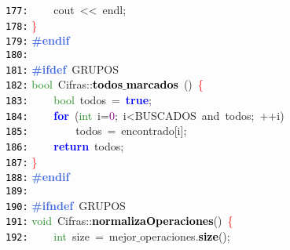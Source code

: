 \documentclass[a4paper,10pt]{scrartcl}
\begin{document}
{   \mbox{}\texttt{\textcolor{Black}{177:}} \ \ \ \ cout\ \textcolor{BrickRed}{\textless{}\textless{}}\ endl\textcolor{BrickRed}{;} \\
   \mbox{}\texttt{\textcolor{Black}{178:}} \textcolor{Red}{\}} \\
   \mbox{}\texttt{\textcolor{Black}{179:}} \textbf{\textcolor{RoyalBlue}{\#endif}} \\
   \mbox{}\texttt{\textcolor{Black}{180:}}  \\
   \mbox{}\texttt{\textcolor{Black}{181:}} \textbf{\textcolor{RoyalBlue}{\#ifdef}}\ GRUPOS \\
   \mbox{}\texttt{\textcolor{Black}{182:}} \textcolor{ForestGreen}{bool}\ Cifras\textcolor{BrickRed}{::}\textbf{\textcolor{Black}{todos$\_$marcados}}\ \textcolor{BrickRed}{()}\ \textcolor{Red}{\{} \\
   \mbox{}\texttt{\textcolor{Black}{183:}} \ \ \ \ \textcolor{ForestGreen}{bool}\ todos\ \textcolor{BrickRed}{=}\ \textbf{\textcolor{Blue}{true}}\textcolor{BrickRed}{;} \\
   \mbox{}\texttt{\textcolor{Black}{184:}} \ \ \ \ \textbf{\textcolor{Blue}{for}}\ \textcolor{BrickRed}{(}\textcolor{ForestGreen}{int}\ i\textcolor{BrickRed}{=}\textcolor{Purple}{0}\textcolor{BrickRed}{;}\ i\textcolor{BrickRed}{\textless{}}BUSCADOS\ \textcolor{TealBlue}{and}\ todos\textcolor{BrickRed}{;}\ \textcolor{BrickRed}{++}i\textcolor{BrickRed}{)} \\
   \mbox{}\texttt{\textcolor{Black}{185:}} \ \ \ \ \ \ \ \ todos\ \textcolor{BrickRed}{=}\ encontrado\textcolor{BrickRed}{[}i\textcolor{BrickRed}{];} \\
   \mbox{}\texttt{\textcolor{Black}{186:}} \ \ \ \ \textbf{\textcolor{Blue}{return}}\ todos\textcolor{BrickRed}{;} \\
   \mbox{}\texttt{\textcolor{Black}{187:}} \textcolor{Red}{\}} \\
   \mbox{}\texttt{\textcolor{Black}{188:}} \textbf{\textcolor{RoyalBlue}{\#endif}} \\
   \mbox{}\texttt{\textcolor{Black}{189:}}  \\
   \mbox{}\texttt{\textcolor{Black}{190:}} \textbf{\textcolor{RoyalBlue}{\#ifndef}}\ GRUPOS \\
   \mbox{}\texttt{\textcolor{Black}{191:}} \textcolor{ForestGreen}{void}\ Cifras\textcolor{BrickRed}{::}\textbf{\textcolor{Black}{normalizaOperaciones}}\textcolor{BrickRed}{()}\ \textcolor{Red}{\{} \\
   \mbox{}\texttt{\textcolor{Black}{192:}} \ \ \ \ \textcolor{ForestGreen}{int}\ size\ \textcolor{BrickRed}{=}\ mejor$\_$operaciones\textcolor{BrickRed}{.}\textbf{\textcolor{Black}{size}}\textcolor{BrickRed}{();} \\
}
\end{document}
